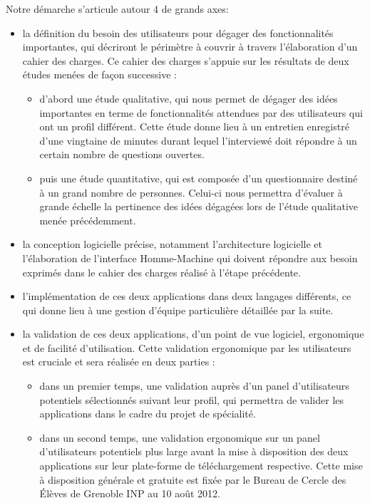 \documentclass[a4paper,11px]{article}
\begin{document}
Notre démarche s'articule autour 4 de grands axes:
\newline
\begin{itemize}
 	\item[\textbullet] la définition du besoin des utilisateurs pour dégager des fonctionnalités importantes, qui décriront le périmètre à couvrir à travers l'élaboration d'un cahier des charges. Ce cahier des charges s'appuie sur les résultats de deux études menées de façon successive : 
	\begin{itemize}
		\item d'abord une étude qualitative, qui nous permet de dégager des idées importantes en terme de fonctionnalités attendues par des utilisateurs qui ont un profil différent. Cette étude donne lieu à un entretien enregistré d'une vingtaine de minutes durant lequel l'interviewé doit répondre à un certain nombre de questions ouvertes.
		\item puis une étude quantitative, qui est composée d'un questionnaire destiné à un grand nombre de personnes. Celui-ci nous permettra d'évaluer à grande échelle la pertinence des idées dégagées lors de l'étude qualitative menée précédemment.
	\end{itemize}

	\item[\textbullet] la conception logicielle précise, notamment l'architecture logicielle et l'élaboration de l'interface Homme-Machine qui doivent répondre aux besoin exprimés dans le cahier des charges réalisé à l'étape précédente.

	\item[\textbullet] l'implémentation de ces deux applications dans deux langages différents, ce qui donne lieu à une gestion d'équipe particulière détaillée par la suite.\\
	\item[\textbullet] la validation de ces deux applications, d'un point de vue logiciel, ergonomique et de facilité d'utilisation. Cette validation ergonomique par les utilisateurs est cruciale et sera réalisée en deux parties :
	\begin{itemize}
		\item dans un premier temps, une validation auprès d'un panel d'utilisateurs potentiels sélectionnés suivant leur profil, qui permettra de valider les applications dans le cadre du projet de spécialité.
		\item dans un second temps, une validation ergonomique sur un panel d'utilisateurs potentiels plus large avant la mise à disposition des deux applications sur leur plate-forme de téléchargement respective. Cette mise à disposition générale et gratuite est fixée par le Bureau de Cercle des \'Elèves de Grenoble INP au 10 août 2012.
\\
\\
\\
	\end{itemize}
\end{itemize}
\end{document}
